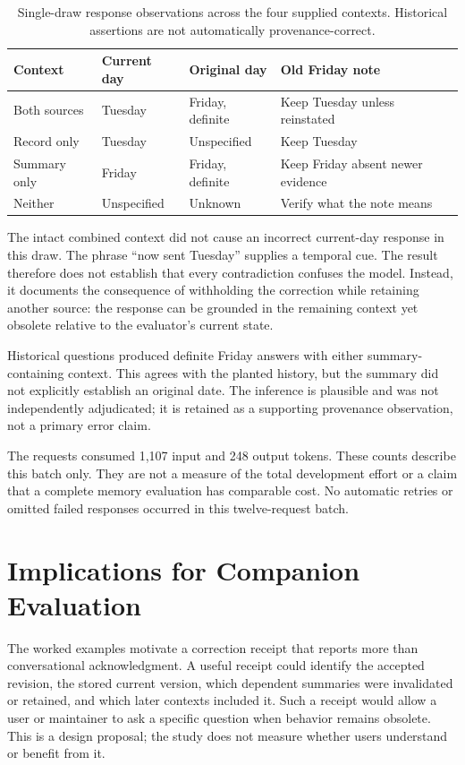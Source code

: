 \documentclass[runningheads]{llncs}
\begin{document}
\begin{table}[t]
\caption{Single-draw response observations across the four supplied contexts. Historical assertions are not automatically provenance-correct.}\label{tab:context}
\small
\begin{tabular}{p{2.5cm}p{1.5cm}p{2.6cm}p{4.0cm}}
\toprule
Context & Current day & Original day & Old Friday note \\
\midrule
Both sources & Tuesday & Friday, definite & Keep Tuesday unless reinstated \\
Record only & Tuesday & Unspecified & Keep Tuesday \\
Summary only & Friday & Friday, definite & Keep Friday absent newer evidence \\
Neither & Unspecified & Unknown & Verify what the note means \\
\bottomrule
\end{tabular}
\end{table}

The intact combined context did not cause an incorrect current-day response in this draw. The phrase ``now sent Tuesday'' supplies a temporal cue. The result therefore does not establish that every contradiction confuses the model. Instead, it documents the consequence of withholding the correction while retaining another source: the response can be grounded in the remaining context yet obsolete relative to the evaluator's current state.

Historical questions produced definite Friday answers with either summary-containing context. This agrees with the planted history, but the summary did not explicitly establish an original date. The inference is plausible and was not independently adjudicated; it is retained as a supporting provenance observation, not a primary error claim.

The requests consumed 1,107 input and 248 output tokens. These counts describe this batch only. They are not a measure of the total development effort or a claim that a complete memory evaluation has comparable cost. No automatic retries or omitted failed responses occurred in this twelve-request batch.

\section{Implications for Companion Evaluation}
The worked examples motivate a correction receipt that reports more than conversational acknowledgment. A useful receipt could identify the accepted revision, the stored current version, which dependent summaries were invalidated or retained, and which later contexts included it. Such a receipt would allow a user or maintainer to ask a specific question when behavior remains obsolete. This is a design proposal; the study does not measure whether users understand or benefit from it.
\end{document}
